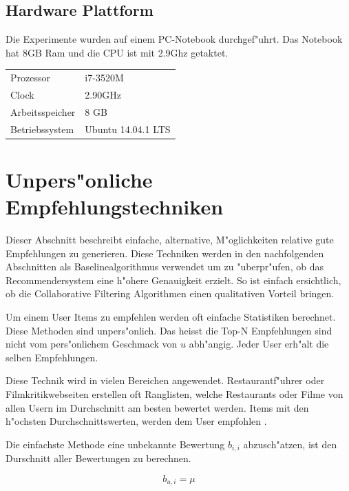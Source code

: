 \documentclass[a4paper, 12pt]{article}
\begin{document}
\subsection{Hardware Plattform}
\label{platform}

Die Experimente wurden auf einem PC-Notebook durchgef"uhrt. Das Notebook hat 8GB Ram und die CPU ist mit 2.9Ghz getaktet.

\begin{center}
\begin{tabular}{ll}
 Prozessor        &  i7-3520M            \\
 Clock            &  2.90GHz             \\
 Arbeitsspeicher  &  8 GB                \\
 Betriebssystem   &  Ubuntu 14.04.1 LTS  \\
\end{tabular}
\end{center}


\section{Unpers"onliche Empfehlungstechniken}
\label{sec:simple}

Dieser Abschnitt beschreibt einfache, alternative, M"oglichkeiten relative gute Empfehlungen zu generieren. Diese Techniken werden in den nachfolgenden Abschnitten als Baselinealgorithmus verwendet um zu "uberpr"ufen, ob das Recommendersystem eine h"ohere Genauigkeit erzielt. So ist einfach ersichtlich, ob die Collaborative Filtering Algorithmen einen qualitativen Vorteil bringen.

Um einem User Items zu empfehlen werden oft einfache Statistiken berechnet. Diese Methoden sind unpers"onlich. Das heisst die Top-N Empfehlungen sind nicht vom pers"onlichem Geschmack von $u$ abh"angig. Jeder User erh"alt die selben Empfehlungen. 

Diese Technik wird in vielen Bereichen angewendet. Restaurantf"uhrer oder Filmkritikwebseiten erstellen oft Ranglisten, welche Restaurants oder Filme von allen Usern im Durchschnitt am besten bewertet werden. Items mit den h"ochsten Durchschnittswerten, werden dem User empfohlen \cite{jannach11}.

Die einfachste Methode eine unbekannte Bewertung $b_{i,i}$ abzusch"atzen, ist den Durschnitt aller Bewertungen zu berechnen.

\begin{equation}
  \label{eq:avg}
  b_{u,i} = \mu
\end{equation}
\end{document}
